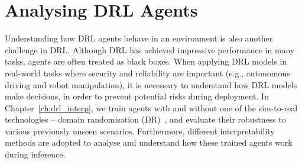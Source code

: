 \section{Analysing DRL Agents}

Understanding how DRL agents behave in an environment is also another challenge in DRL. Although DRL has achieved impressive performance in many tasks, agents are often treated as black boxes. When applying DRL models in real-world tasks where security and reliability are important (e.g., autonomous driving and robot manipulation), it is necessary to understand how DRL models make decisions, in order to prevent potential risks during deployment. In Chapter~\ref{ch:drl_interp}, we train agents with and without one of the sim-to-real technologies -- domain randomisation (DR)~\cite{andrychowicz2018learning,james2017transferring,peng2018sim,sadeghi2017cad2rl,tobin2017domain}, and evaluate their robustness to various previously unseen scenarios. Furthermore, different interpretability methods are adopted to analyse and understand how these trained agents work during inference.

